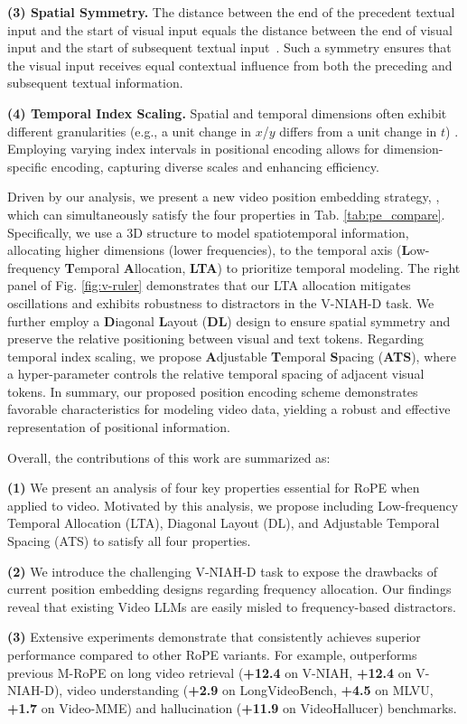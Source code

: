 \textbf{(3) Spatial Symmetry.} The distance between the end of the precedent textual input and the start of visual input equals the distance between the end of visual input and the start of subsequent textual input~\cite{kexuefm10352}. Such a symmetry ensures that the visual input receives equal contextual influence from both the preceding and subsequent textual information.

\textbf{(4) Temporal Index Scaling.} Spatial and temporal dimensions often exhibit different granularities (e.g., a unit change in $x$/$y$ differs from a unit change in $t$) \cite{gao2024tc}.
Employing varying index intervals in positional encoding allows for dimension-specific encoding, capturing diverse scales and enhancing efficiency.

Driven by our analysis, we present a new video position embedding strategy, \textbf{\methodname}, which can simultaneously satisfy the four properties in Tab. \ref{tab:pe_compare}.
Specifically, we use a 3D structure to model spatiotemporal information, allocating higher dimensions (lower frequencies), to the temporal axis (\textbf{L}ow-frequency \textbf{T}emporal \textbf{A}llocation, \textbf{LTA}) to prioritize temporal modeling.
The right panel of Fig. \ref{fig:v-ruler} demonstrates that our LTA allocation mitigates oscillations and exhibits robustness to distractors in the V-NIAH-D task.
We further employ a \textbf{D}iagonal \textbf{L}ayout (\textbf{DL}) design to ensure spatial symmetry and preserve the relative positioning between visual and text tokens.
Regarding temporal index scaling, we propose \textbf{A}djustable \textbf{T}emporal \textbf{S}pacing (\textbf{ATS}), where a hyper-parameter controls the relative temporal spacing of adjacent visual tokens.
In summary, our proposed position encoding scheme demonstrates favorable characteristics for modeling video data, yielding a robust and effective representation of positional information.

Overall, the contributions of this work are summarized as:

\textbf{(1)} We present an analysis of four key properties essential for RoPE when applied to video. Motivated by this analysis, we propose \methodname including Low-frequency Temporal Allocation (LTA), Diagonal Layout (DL), and Adjustable Temporal Spacing (ATS) to satisfy all four properties.

\textbf{(2)} We introduce the challenging V-NIAH-D task to expose the drawbacks of current position embedding designs regarding frequency allocation. Our findings reveal that existing Video LLMs are easily misled to frequency-based distractors.

\textbf{(3)} Extensive experiments demonstrate that \methodname consistently achieves superior performance compared to other RoPE variants. For example, \methodname outperforms previous M-RoPE on long video retrieval (\textbf{+12.4} on V-NIAH, \textbf{+12.4} on V-NIAH-D), video understanding (\textbf{+2.9} on LongVideoBench, \textbf{+4.5} on MLVU, \textbf{+1.7} on Video-MME) and hallucination (\textbf{+11.9} on VideoHallucer) benchmarks.